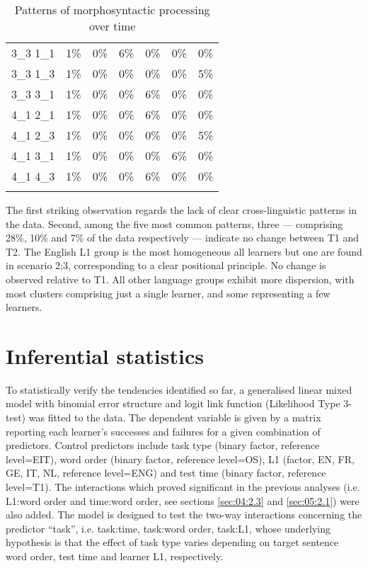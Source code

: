 \begin{table}
{\begin{tabular}{lrrrrrr}
    3\_3 1\_1 & 1\% & 0\% & 6\% & 0\% & 0\% & 0\%\\
    3\_3 1\_3 & 1\% & 0\% & 0\% & 0\% & 0\% & 5\%\\
    3\_3 3\_1 & 1\% & 0\% & 0\% & 6\% & 0\% & 0\%\\
    4\_1 2\_1 & 1\% & 0\% & 0\% & 6\% & 0\% & 0\%\\
    4\_1 2\_3 & 1\% & 0\% & 0\% & 0\% & 0\% & 5\%\\
    4\_1 3\_1 & 1\% & 0\% & 0\% & 0\% & 6\% & 0\%\\
    4\_1 4\_3 & 1\% & 0\% & 0\% & 6\% & 0\% & 0\%\\
    \lspbottomrule
    \end{tabular}
    }
    \caption{Patterns of morphosyntactic processing over time}
    \label{tab:06:6}
\end{table}

The first striking observation regards the lack of clear cross-linguistic patterns in the data. Second, among the five most common patterns, three — comprising 28\%, 10\% and 7\% of the data respectively — indicate no change between T1 and T2. The English L1 group is the most homogeneous all learners but one are found in scenario 2;3, corresponding to a clear positional principle. No change is observed relative to T1. All other language groups exhibit more dispersion, with most clusters comprising just a single learner, and some representing a few learners. 

\section{Inferential statistics}\label{sec:06:4}

To statistically verify the tendencies identified so far, a generalised linear mixed model with binomial error structure and logit link function (Likelihood Type 3-test) was fitted to the data. The dependent variable is given by a matrix reporting each learner’s successes and failures for a given combination of predictors. Control predictors include task type (binary factor, reference level=EIT), word order (binary factor, reference level=OS), L1 (factor, EN, FR, GE, IT, NL, reference level=ENG) and test time (binary factor, reference level=T1). The interactions which proved significant in the previous analyses (i.e. L1:word order and time:word order, see sections \ref{sec:04:2.3} and \ref{sec:05:2.1}) were also added. The model is designed to test the two-way interactions concerning the predictor “task”, i.e. task:time, task:word order, task:L1, whose underlying hypothesis is that the effect of task type varies depending on target sentence word order, test time and learner L1, respectively. 

